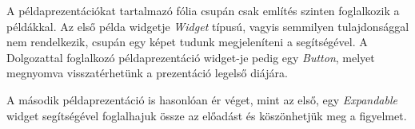 A példaprezentációkat tartalmazó fólia csupán csak említés szinten foglalkozik a példákkal. Az első példa widgetje \textit{Widget} típusú, vagyis semmilyen tulajdonsággal nem rendelkezik, csupán egy képet tudunk megjeleníteni a segítségével. A Dolgozattal foglalkozó példaprezentáció widget-je pedig egy \textit{Button}, melyet megnyomva visszatérhetünk a prezentáció legelső diájára.

A második példaprezentáció is hasonlóan ér véget, mint az első, egy \textit{Expandable} widget segítségével foglalhajuk össze az előadást és köszönhetjük meg a figyelmet.
